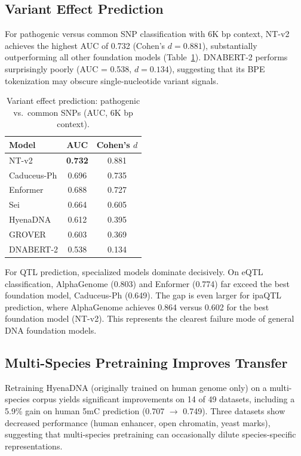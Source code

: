 \documentclass[11pt]{article}
\begin{document}
\subsection{Variant Effect Prediction}

For pathogenic versus common SNP classification with 6K bp context, NT-v2 achieves the highest AUC of 0.732 (Cohen's $d = 0.881$), substantially outperforming all other foundation models (Table~\ref{tab:variant}). DNABERT-2 performs surprisingly poorly (AUC = 0.538, $d = 0.134$), suggesting that its BPE tokenization may obscure single-nucleotide variant signals.

\begin{table}[h]
\centering
\caption{Variant effect prediction: pathogenic vs.\ common SNPs (AUC, 6K bp context).}
\label{tab:variant}
\begin{tabular}{lcc}
\toprule
Model & AUC & Cohen's $d$ \\
\midrule
NT-v2 & \textbf{0.732} & 0.881 \\
Caduceus-Ph & 0.696 & 0.735 \\
Enformer & 0.688 & 0.727 \\
Sei & 0.664 & 0.605 \\
HyenaDNA & 0.612 & 0.395 \\
GROVER & 0.603 & 0.369 \\
DNABERT-2 & 0.538 & 0.134 \\
\bottomrule
\end{tabular}
\end{table}

For QTL prediction, specialized models dominate decisively. On eQTL classification, AlphaGenome (0.803) and Enformer (0.774) far exceed the best foundation model, Caduceus-Ph (0.649). The gap is even larger for ipaQTL prediction, where AlphaGenome achieves 0.864 versus 0.602 for the best foundation model (NT-v2). This represents the clearest failure mode of general DNA foundation models.

\subsection{Multi-Species Pretraining Improves Transfer}

Retraining HyenaDNA (originally trained on human genome only) on a multi-species corpus yields significant improvements on 14 of 49 datasets, including a 5.9\% gain on human 5mC prediction (0.707 $\rightarrow$ 0.749). Three datasets show decreased performance (human enhancer, open chromatin, yeast marks), suggesting that multi-species pretraining can occasionally dilute species-specific representations.
\end{document}
